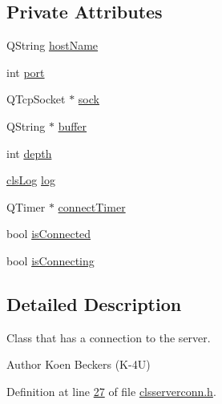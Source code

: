 \subsection*{Private Attributes}
\begin{DoxyCompactItemize}
\item 
Q\-String \hyperlink{classclient_1_1cls_server_conn_a4d20263884ea30ec6874547856081bef}{host\-Name}
\item 
int \hyperlink{classclient_1_1cls_server_conn_acd1b648e44713f2ae1fc375848b3cdf5}{port}
\item 
Q\-Tcp\-Socket $\ast$ \hyperlink{classclient_1_1cls_server_conn_a482564a7684e6ba545efb80cd1b5f20b}{sock}
\item 
Q\-String $\ast$ \hyperlink{classclient_1_1cls_server_conn_ac1da1dd86f59f8249d32506e220ec523}{buffer}
\item 
int \hyperlink{classclient_1_1cls_server_conn_a88a917c19535b9ab06983f11904b1ddb}{depth}
\item 
\hyperlink{class_k4_u_1_1cls_log}{cls\-Log} \hyperlink{classclient_1_1cls_server_conn_afcf2aa947f9e71eabcab017c77730d8f}{log}
\item 
Q\-Timer $\ast$ \hyperlink{classclient_1_1cls_server_conn_ae7fe91be71bfb453f3f9b9013935d222}{connect\-Timer}
\item 
bool \hyperlink{classclient_1_1cls_server_conn_a9b495d36fa12f4454170b94a5f46d3d4}{is\-Connected}
\item 
bool \hyperlink{classclient_1_1cls_server_conn_aec00b35661dd2f98dd0fd57331f11883}{is\-Connecting}
\end{DoxyCompactItemize}


\subsection{Detailed Description}
Class that has a connection to the server. 

\begin{DoxyAuthor}{Author}
Koen Beckers (K-\/4\-U) 
\end{DoxyAuthor}


Definition at line \hyperlink{clsserverconn_8h_source_l00027}{27} of file \hyperlink{clsserverconn_8h_source}{clsserverconn.\-h}.



